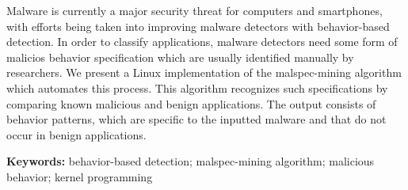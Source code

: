 
Malware is currently a major security threat for computers and smartphones, with efforts being taken into improving malware detectors with behavior-based detection. In order to classify applications, malware detectors need some form of malicios behavior specification which are usually identified manually by researchers. We present a Linux implementation of the malspec-mining algorithm which automates this process. This algorithm recognizes such specifications by comparing known malicious and benign applications. The output consists of behavior patterns, which are specific to the inputted malware and that do not occur in benign applications.

\textbf{Keywords:} behavior-based detection; malspec-mining algorithm; malicious behavior; kernel programming
